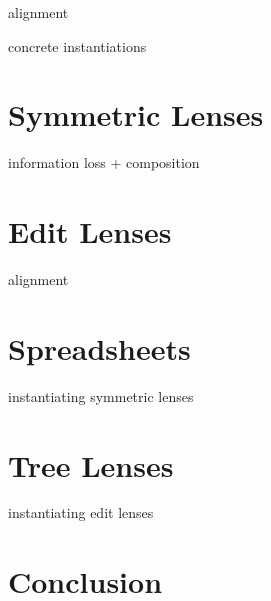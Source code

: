 \documentclass[12pt]{report}
\theoremstyle{definition}
\theoremstyle{remark}
\numberwithin{equation}{section}
\begin{document}
alignment

concrete instantiations

\chapter{Symmetric Lenses}

information loss + composition

\chapter{Edit Lenses}

alignment

\chapter{Spreadsheets}

instantiating symmetric lenses

\chapter{Tree Lenses}

instantiating edit lenses

\chapter{Conclusion}

%
\end{document}

